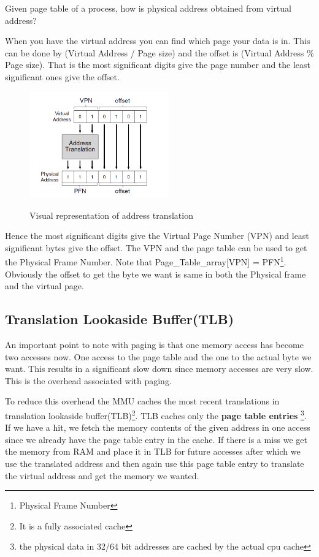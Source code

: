 \documentclass[12pt]{article}
\begin{document}
Given page table of a process, how is physical address obtained from virtual address?

When you have the virtual address you can find which page your data is in. This can be done by (Virtual Address / Page size) and the offset is (Virtual Address \% Page size).
That is the most significant digits give the page number and the least significant ones give the offset. 

\begin{figure}
    \begin{center}
        \includegraphics[width = 6cm]{address_translation.png}
        \label{figure:address_translation}
        \caption{Visual representation of address translation}
    \end{center}
\end{figure}


Hence the most significant digits give the Virtual Page Number (VPN) and least significant bytes give the offset. The VPN and the page
table can be used to get the Physical Frame Number. Note that Page\_Table\_array[VPN] = PFN\footnote{Physical Frame Number}. Obviously the offset to get the byte
we want is same in both the Physical frame and the virtual page.

\subsection*{Translation Lookaside Buffer(TLB)}
An important point to note with paging is that one memory access has become two accesses now. One access to the page table and the one to the actual byte we want. This results in a significant
slow down since memory accesses are very slow. This is the overhead associated with paging.

To reduce this overhead the MMU caches the most recent translations in translation lookaside buffer(TLB)\footnote{It is a fully associated cache}.
TLB caches only the \textbf{page table entries} \footnote{the physical data in 32/64 bit addresses are cached by the actual cpu cache}. If we have
a hit, we fetch the memory contents of the given address in one access since we already have the page table entry in the cache. If there is a miss we get the memory from RAM and place it in TLB for future accesses after 
which we use the translated address and then again use this page table entry to translate the virtual address and get the memory we wanted.
\end{document}
